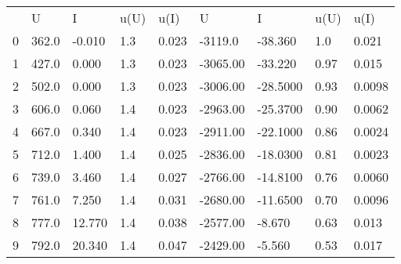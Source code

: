 \begin{tabular}{lllllllll}
 & U & I & u(U) & u(I) & U & I & u(U) & u(I) \\
0 & 362.0 & -0.010 & 1.3 & 0.023 & -3119.0 & -38.360 & 1.0 & 0.021 \\
1 & 427.0 & 0.000 & 1.3 & 0.023 & -3065.00 & -33.220 & 0.97 & 0.015 \\
2 & 502.0 & 0.000 & 1.3 & 0.023 & -3006.00 & -28.5000 & 0.93 & 0.0098 \\
3 & 606.0 & 0.060 & 1.4 & 0.023 & -2963.00 & -25.3700 & 0.90 & 0.0062 \\
4 & 667.0 & 0.340 & 1.4 & 0.023 & -2911.00 & -22.1000 & 0.86 & 0.0024 \\
5 & 712.0 & 1.400 & 1.4 & 0.025 & -2836.00 & -18.0300 & 0.81 & 0.0023 \\
6 & 739.0 & 3.460 & 1.4 & 0.027 & -2766.00 & -14.8100 & 0.76 & 0.0060 \\
7 & 761.0 & 7.250 & 1.4 & 0.031 & -2680.00 & -11.6500 & 0.70 & 0.0096 \\
8 & 777.0 & 12.770 & 1.4 & 0.038 & -2577.00 & -8.670 & 0.63 & 0.013 \\
9 & 792.0 & 20.340 & 1.4 & 0.047 & -2429.00 & -5.560 & 0.53 & 0.017 \\
\end{tabular}
